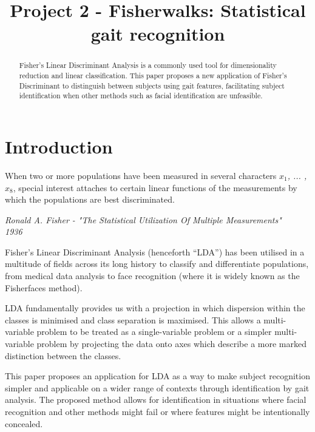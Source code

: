 \documentclass{bmvc2k}
\title{Project 2 - Fisherwalks: Statistical gait recognition}
\begin{document}
\maketitle

\begin{abstract}

   Fisher's Linear Discriminant Analysis is a commonly used tool for dimensionality reduction and linear classification. This paper proposes a new application of Fisher's Discriminant to distinguish between subjects using gait features, facilitating subject identification when other methods such as facial identification are unfeasible.

\end{abstract}

\section{Introduction}

\begin{center}

   When two or more populations have been measured in several characters \textit{$x_1$, ... , $x_8$}, special interest attaches to certain linear functions of the measurements by which the populations are best discriminated.

   \begin{flushright}
      \textit{
         Ronald A. Fisher - "The Statistical Utilization Of Multiple Measurements"\\
         1936
      }
   \end{flushright}
\end{center}

Fisher’s Linear Discriminant Analysis (henceforth “LDA”) has been utilised in a multitude of fields across its long history to classify and differentiate populations, from medical data analysis to face recognition (where it is widely known as the Fisherfaces method).

LDA fundamentally provides us with a projection in which dispersion within the classes is minimised and class separation is maximised\cite{fisher}. This allows a multi-variable problem to be treated as a single-variable problem or a simpler multi-variable problem by projecting the data onto axes which describe a more marked distinction between the classes\cite{dimred}\cite{statanalysis}.

This paper proposes an application for LDA as a way to make subject recognition simpler and applicable on a wider range of contexts through identification by gait analysis. The proposed method allows for identification in situations where facial recognition and other methods might fail or where features might be intentionally concealed.
\end{document}
